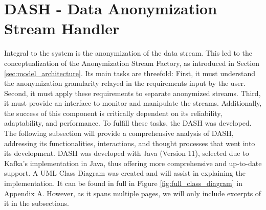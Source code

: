\section{DASH - Data Anonymization Stream Handler\label{sec:dash}}
Integral to the system is the anonymization of the data stream. This led to the conceptualization of the Anonymization Stream Factory, as introduced in Section \ref{sec:model_architecture}. Its main tasks are threefold: First, it must understand the anonymization granularity relayed in the requirements input by the user. Second, it must apply these requirements to separate anonymized streams. Third, it must provide an interface to monitor and manipulate the streams. Additionally, the success of this component is critically dependent on its reliability, adaptability, and performance. To fulfill these tasks, the \acf{DASH} was developed. The following subsection will provide a comprehensive analysis of \ac{DASH}, addressing its functionalities, interactions, and thought processes that went into its development. \ac{DASH} was developed with Java (Version 11), selected due to Kafka's implementation in Java, thus offering more comprehensive and up-to-date support. A UML Class Diagram was created and will assist in explaining the implementation. It can be found in full in Figure \ref{fig:full_class_diagram} in Appendix A. However, as it spans multiple pages, we will only include excerpts of it in the subsections. 

